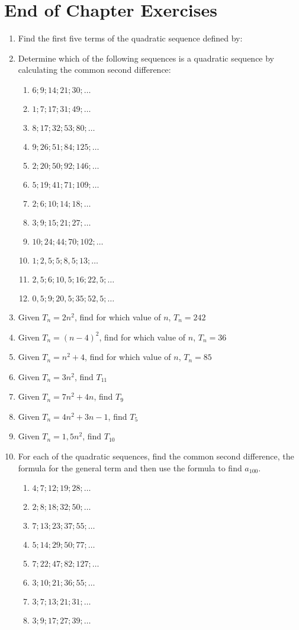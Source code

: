 \section{End of Chapter Exercises}
\begin{enumerate}
\item{Find the first five terms of the quadratic sequence defined by:
}
\item{Determine which of the following sequences is a quadratic sequence by calculating the common second difference:
\begin{enumerate}
\item $6; 9; 14; 21; 30;\ldots$
\item $1; 7; 17; 31; 49;\ldots$
\item $8; 17; 32; 53; 80;\ldots$
\item $9; 26; 51; 84; 125;\ldots$
\item $2; 20; 50; 92; 146;\ldots$
\item $5; 19; 41; 71; 109;\ldots$
\item $2; 6; 10; 14; 18;\ldots$
\item $3; 9; 15; 21; 27;\ldots$
\item $10; 24; 44; 70; 102;\ldots$
\item $1; 2,5; 5; 8,5; 13;\ldots$
\item $2,5; 6; 10,5; 16; 22,5;\ldots$
\item $0,5; 9; 20,5; 35; 52,5;\ldots$
\end{enumerate}}
\item{Given $T_n= 2n^2$, find for which value of $n$, $T_n=242$}
\item{Given $T_n= (n - 4)^2$, find for which value of $n$, $T_n=36$}
\item{Given $T_n= n^2+4$, find for which value of $n$, $T_n=85$}
\item{Given $T_n= 3n^2$, find $T_{11}$}
\item{Given $T_n= 7n^2+4n$, find $T_{9}$}
\item{Given $T_n= 4n^2+3n-1$, find $T_{5}$}
\item{Given $T_n= 1,5n^2$, find $T_{10}$}
\item{For each of the quadratic sequences, find the common second difference, the formula for the general term and then use the formula to find $a_{100}$.
\begin{enumerate}
\item $4;7;12;19;28;\ldots$
\item $2;8;18;32;50;\ldots$
\item $7;13;23;37;55;\ldots$
\item $5;14;29;50;77;\ldots$
\item $7;22;47;82;127;\ldots$
\item $3;10;21;36;55;\ldots$
\item $3;7;13;21;31;\ldots$
\item $3;9;17;27;39;\ldots$
\end{enumerate}}

\end{enumerate}







